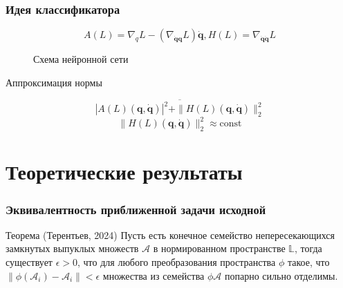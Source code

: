 \documentclass{beamer}
\begin{document}
\begin{frame}
\frametitle{Идея классификатора}
$$A(L) = \nabla_{q} L-\left(\nabla_{\dot{\mathbf{q}}\mathbf{q}} L\right) \dot{\mathbf{q}}, H(L) = \nabla_{\dot{\mathbf{q}} \dot{\mathbf{q}}} L$$

\begin{figure}
\centering
{}
\caption{Схема нейронной сети}
\label{fig: LNN}
\end{figure}
\begin{block}{Аппроксимация нормы}

$$\overline{|A(L)\left(\mathbf{q}, \dot{\mathbf{q}}\right)|^2 + \|H(L)\left(\mathbf{q}, \dot{\mathbf{q}}\right)\|_2^2}$$
$$\|H(L)\left(\mathbf{q}, \dot{\mathbf{q}}\right)\|_2^2 \approx \text{const}$$
\end{block}

\end{frame}

\section{Теоретические результаты}

\begin{frame}
\frametitle{Эквивалентность приближенной задачи исходной}

\begin{block} {Теорема (Терентьев, 2024)}
Пусть есть конечное семейство непересекающихся замкнутых выпуклых множеств $\mathcal{A}$ в нормированном пространстве $\mathbb{L}$, тогда существует $\epsilon > 0$, что для любого преобразования пространства $\phi$ такое, что $\|\phi(\mathcal{A}_{i}) - \mathcal{A}_{i}\| < \epsilon$ множества из семейства $\phi{\mathcal{A}}$ попарно сильно отделимы.
\end{block} 
\end{frame}
\end{document}
